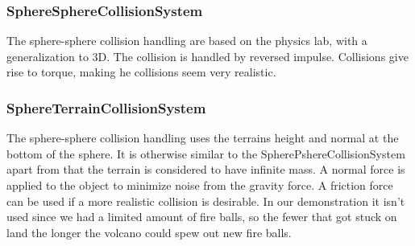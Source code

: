 \subsubsection{SphereSphereCollisionSystem}
The sphere-sphere collision handling are based on the physics lab, with a generalization to 3D. The collision is handled by reversed impulse. Collisions give rise to torque, making he collisions seem very realistic.

\subsubsection{SphereTerrainCollisionSystem}
The sphere-sphere collision handling uses the terrains height and normal at the bottom of the sphere. It is otherwise similar to the SpherePshereCollisionSystem apart from that the terrain is considered to have infinite mass. A normal force is applied to the object to minimize noise from the gravity force. A friction force can be used if a more realistic collision is desirable. In our demonstration it isn't used since we had a limited amount of fire balls, so the fewer that got stuck on land the longer the volcano could spew out new fire balls.
